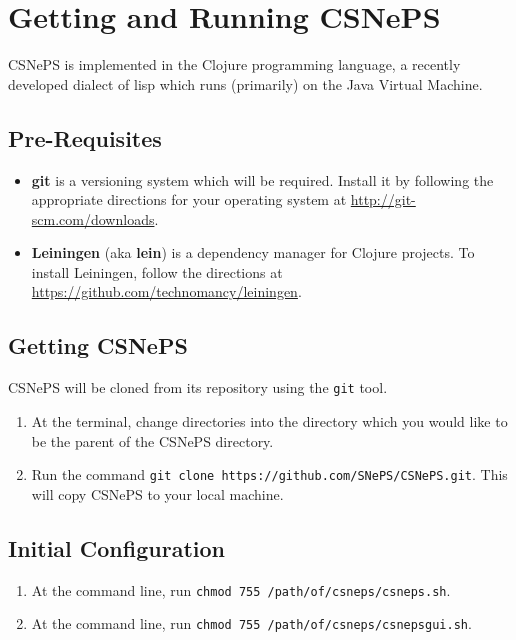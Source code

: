 \documentclass[letterpaper,colorlinks=true,linkcolor=blue]{book}
\begin{document}
\chapter{Getting and Running CSNePS}
CSNePS is implemented in the Clojure programming language, a recently developed 
dialect of lisp which runs (primarily) on the Java Virtual Machine.

\section{Pre-Requisites}

\begin{itemize}
  \item \textbf{git} is a versioning system which will be required. Install it
  by following the appropriate directions for your operating system at \url{http://git-scm.com/downloads}.
  \item \textbf{Leiningen} (aka \textbf{lein}) is a dependency manager for 
  Clojure projects. To install Leiningen, follow the directions at 
  \url{https://github.com/technomancy/leiningen}.
\end{itemize}

\section{Getting CSNePS}

CSNePS will be cloned from its repository using the \texttt{git} tool.

\begin{enumerate}
  \item At the terminal, change directories into the directory which you would like to be the parent of the CSNePS directory. 
  \item Run the command \texttt{git clone https://github.com/SNePS/CSNePS.git}. This will copy CSNePS to your local machine.
\end{enumerate}

\section{Initial Configuration}

\begin{enumerate}
  \item At the command line, run \texttt{chmod 755 /path/of/csneps/csneps.sh}.
  \item At the command line, run \texttt{chmod 755 /path/of/csneps/csnepsgui.sh}.
\end{enumerate}
\end{document}
